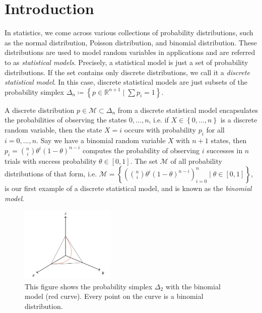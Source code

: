 \chapter{Introduction} 

In statistics, we come across various collections of probability distributions, such as the normal distribution, Poisson distribution, and binomial distribution. These distributions are used to model random variables in applications and are referred to as \emph{statistical models}. Precisely, a statistical model is just a set of probability distributions. If the set contains only discrete distributions, we call it a \emph{discrete statistical model}. In this case, discrete statistical models are just subsets of the probability simplex \( \Delta_n \coloneqq \left\{ p \in \mathbb{R}^{n + 1} \mid \sum p_i = 1 \right\} \). 

A discrete distribution \( p \in \mathcal{M} \subset \Delta_n \) from a discrete statistical model encapsulates the probabilities of observing the states \( 0, \dots, n \), i.e. if \( X \in \left\{ 0, \dots, n \right\} \) is a discrete random variable, then the state \( X = i \) occurs with probability \( p_i \) for all \( i = 0, \dots, n \). Say we have a binomial random variable \( X \) with \( n + 1 \) states, then \( p_i = \binom{n}{i} \theta^i (1-\theta)^{n-i} \) computes the probability of observing \( i \) successes in \( n \) trials with success probability \( \theta \in [0,1] \). The set \( \mathcal{M} \) of all probability distributions of that form, i.e. \( \mathcal{M} = \left\{ (\binom{n}{i} \theta^i (1-\theta)^{n-i})_{i=0}^n \mid \theta \in [0,1] \right\} \), is our first example of a discrete statistical model, and is known as the \emph{binomial model}.

\begin{figure}
    \centering
    \includegraphics[width=0.4\textwidth]{assets/binom-discrete-model.png}
    \caption{This figure shows the probability simplex \( \Delta_2 \) with the binomial model (red curve). Every point on the curve is a binomial distribution.}
    \label{fig:binom-discrete-model}
\end{figure}

